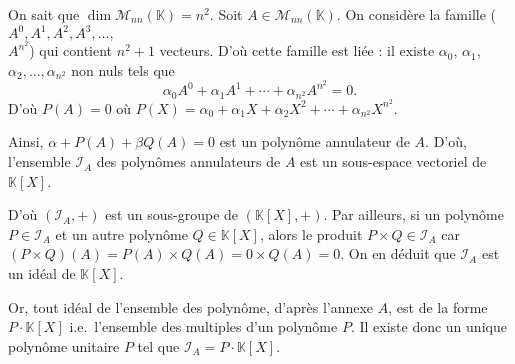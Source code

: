 \begin{prv}
	On sait que $\dim \mathscr{M}_{nn}(\mathds{K}) = n^2$. Soit $A \in \mathscr{M}_{nn}(\mathds{K})$. On considère la famille ($A^0, A^1, A^2, A^3, \ldots,$\\$A^{n^2}$) qui contient $n^2 + 1$\/ vecteurs. D'où cette famille est liée : il existe $\alpha_0$, $\alpha_1$, $\alpha_2, \ldots,\alpha_{n^2}$ non nuls tels que \[
		\alpha_0 A^0 + \alpha_1 A^1 + \cdots + \alpha_{n^2} A^{n^2} = 0.
	\] D'où $P(A) = 0$\/ où $P(X) = \alpha_0 + \alpha_1 X + \alpha_2 X^2 + \cdots  + \alpha_{n^2} X^{n^2}$.

	Ainsi, $\alpha + P(A) + \beta Q(A) = 0$\/ est un polynôme annulateur de $A$. D'où, l'ensemble $\mathcal{I}_A$\/ des polynômes annulateurs de $A$\/ est un sous-espace vectoriel de $\mathds{K}[X]$.

	D'où $(\mathcal{I}_A,+)$\/ est un sous-groupe de $(\mathds{K}[X],+)$. Par ailleurs, si un polynôme $P \in \mathcal{I}_A$\/ et un autre polynôme $Q \in \mathds{K}[X]$, alors le produit $P \times Q \in \mathcal{I}_A$\/ car $(P\times Q)(A) = P(A) \times Q(A) = 0 \times Q(A) = 0$.
	On en déduit que $\mathcal{I}_A$\/ est un idéal de $\mathds{K}[X]$.

	Or, tout idéal de l'ensemble des polynôme, d'après l'annexe $A$, est de la forme $P\cdot \mathds{K}[X]$\/ i.e.\ l'ensemble des multiples d'un polynôme $P$.
	Il existe donc un unique polynôme unitaire $P$\/ tel que $\mathcal{I}_A = P\cdot \mathds{K}[X]$.
\end{prv}

